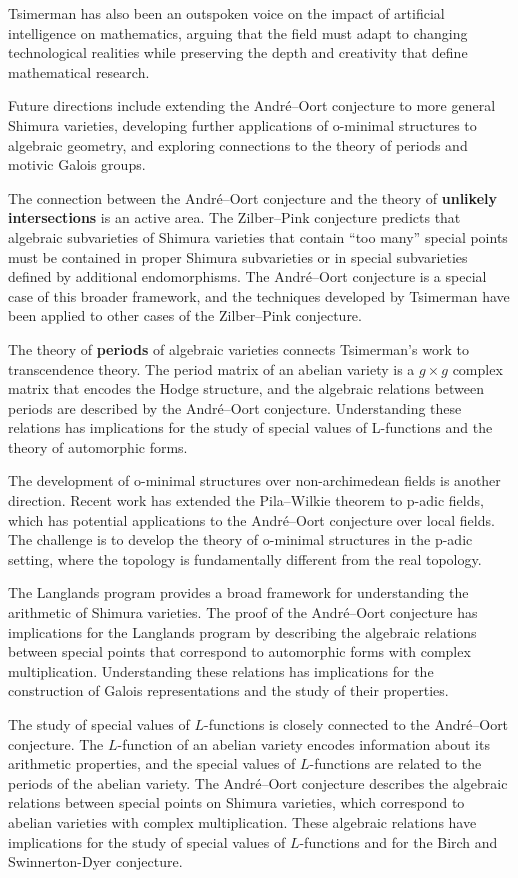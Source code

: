 Tsimerman has also been an outspoken voice on the impact of artificial intelligence on mathematics, arguing that the field must adapt to changing technological realities while preserving the depth and creativity that define mathematical research.

Future directions include extending the Andr\'{e}--Oort conjecture to more general Shimura varieties, developing further applications of o-minimal structures to algebraic geometry, and exploring connections to the theory of periods and motivic Galois groups.

The connection between the Andr\'{e}--Oort conjecture and the theory of \textbf{unlikely intersections} is an active area. The Zilber--Pink conjecture predicts that algebraic subvarieties of Shimura varieties that contain ``too many'' special points must be contained in proper Shimura subvarieties or in special subvarieties defined by additional endomorphisms. The Andr\'{e}--Oort conjecture is a special case of this broader framework, and the techniques developed by Tsimerman have been applied to other cases of the Zilber--Pink conjecture.

The theory of \textbf{periods} of algebraic varieties connects Tsimerman's work to transcendence theory. The period matrix of an abelian variety is a $g \times g$ complex matrix that encodes the Hodge structure, and the algebraic relations between periods are described by the Andr\'{e}--Oort conjecture. Understanding these relations has implications for the study of special values of L-functions and the theory of automorphic forms.

The development of o-minimal structures over non-archimedean fields is another direction. Recent work has extended the Pila--Wilkie theorem to p-adic fields, which has potential applications to the Andr\'{e}--Oort conjecture over local fields. The challenge is to develop the theory of o-minimal structures in the p-adic setting, where the topology is fundamentally different from the real topology.

The Langlands program provides a broad framework for understanding the arithmetic of Shimura varieties. The proof of the Andr\'{e}--Oort conjecture has implications for the Langlands program by describing the algebraic relations between special points that correspond to automorphic forms with complex multiplication. Understanding these relations has implications for the construction of Galois representations and the study of their properties.

The study of special values of $L$-functions is closely connected to the Andr\'{e}--Oort conjecture. The $L$-function of an abelian variety encodes information about its arithmetic properties, and the special values of $L$-functions are related to the periods of the abelian variety. The Andr\'{e}--Oort conjecture describes the algebraic relations between special points on Shimura varieties, which correspond to abelian varieties with complex multiplication. These algebraic relations have implications for the study of special values of $L$-functions and for the Birch and Swinnerton-Dyer conjecture.

